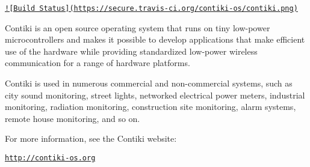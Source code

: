 \href{http://travis-ci.org/contiki-os/contiki}{\tt !\mbox{[}Build Status\mbox{]}(https\+://secure.\+travis-\/ci.\+org/contiki-\/os/contiki.\+png)}

Contiki is an open source operating system that runs on tiny low-\/power microcontrollers and makes it possible to develop applications that make efficient use of the hardware while providing standardized low-\/power wireless communication for a range of hardware platforms.

Contiki is used in numerous commercial and non-\/commercial systems, such as city sound monitoring, street lights, networked electrical power meters, industrial monitoring, radiation monitoring, construction site monitoring, alarm systems, remote house monitoring, and so on.

For more information, see the Contiki website\+:

\href{http://contiki-os.org}{\tt http\+://contiki-\/os.\+org} 